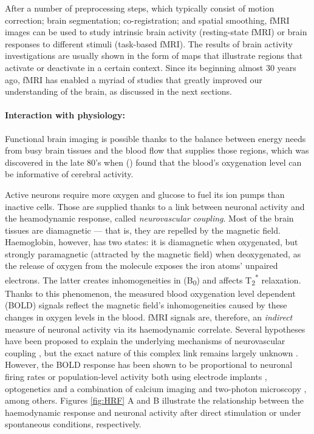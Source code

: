 After a number of preprocessing steps, which typically consist of motion correction; brain segmentation; co-registration; and spatial smoothing, fMRI images can be used to study intrinsic brain activity (resting-state fMRI) or brain responses to different stimuli (task-based fMRI). The results of brain activity investigations are usually shown in the form of maps that illustrate regions that activate or deactivate in a certain context. Since its beginning almost 30 years ago, fMRI has enabled a myriad of studies that greatly improved our understanding of the brain, as discussed in the next sections.


\paragraph{Interaction with physiology:} Functional brain imaging is possible thanks to the balance between energy needs from busy brain tissues and the blood flow that supplies those regions, which was discovered in the late 80's when \citeauthor{Ogawa1990} (\citeyear{Ogawa1990}) found that the blood's oxygenation level can be informative of cerebral activity.  

Active neurons require more oxygen and glucose to fuel its ion pumps than inactive cells. 
Those are supplied thanks to a link between neuronal activity and the heamodynamic response, called \textit{neurovascular coupling}. 
Most of the brain tissues are diamagnetic --- that is, they are repelled by the magnetic field. Haemoglobin, however, has two states: it is diamagnetic when oxygenated, but strongly paramagnetic (attracted by the magnetic field) when deoxygenated, as the release of oxygen from the molecule exposes the iron atoms' unpaired electrons. 
The latter creates inhomogeneities in (B\textsubscript{0}) and affects T\textsubscript{2}\textsuperscript{*} relaxation.
Thanks to this phenomenon, the measured blood oxygenation level dependent (BOLD) signals reflect the magnetic field’s inhomogeneities caused by these changes in oxygen levels in the blood.  
fMRI signals are, therefore, an \textit{indirect} measure of neuronal activity via its haemodynamic correlate. Several hypotheses have been proposed to explain the underlying mechanisms of neurovascular coupling \citep{Attwell2011}, but the exact nature of this complex link remains largely unknown \citep{Logothetis2004, Logothetis2008}.
However, the BOLD response has been shown to
be proportional to neuronal firing rates or population-level activity both using electrode implants \citep{Heeger2000}, optogenetics \citep{Lee2010, Kahn2011} and a combination of calcium imaging and two-photon microscopy \citep{Ma2016, OHerron2016}, among others. Figures \ref{fig:HRF} A and B illustrate the relationship between the haemodynamic response and neuronal activity after direct stimulation or under spontaneous conditions, respectively. %


